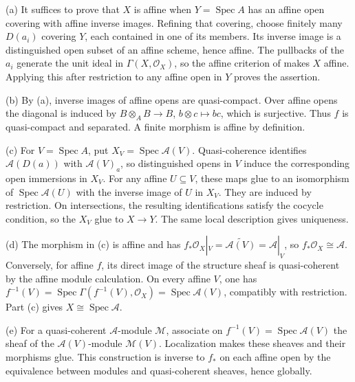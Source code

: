 (a) It suffices to prove that $X$ is affine when $Y=\operatorname{Spec}A$ has an affine open covering with affine inverse images. Refining that covering, choose finitely many $D(a_i)$ covering $Y$, each contained in one of its members. Its inverse image is a distinguished open subset of an affine scheme, hence affine. The pullbacks of the $a_i$ generate the unit ideal in $\Gamma(X,\mathcal O_X)$, so the affine criterion of  makes $X$ affine. Applying this after restriction to any affine open in $Y$ proves the assertion.

(b) By (a), inverse images of affine opens are quasi-compact. Over affine opens the diagonal is induced by $B\otimes_AB\to B$, $b\otimes c\mapsto bc$, which is surjective. Thus $f$ is quasi-compact and separated. A finite morphism is affine by definition.

(c) For $V=\operatorname{Spec}A$, put $X_V=\operatorname{Spec}\mathcal A(V)$. Quasi-coherence identifies $\mathcal A(D(a))$ with $\mathcal A(V)_a$, so distinguished opens in $V$ induce the corresponding open immersions in $X_V$. For any affine $U\subseteq V$, these maps glue to an isomorphism of $\operatorname{Spec}\mathcal A(U)$ with the inverse image of $U$ in $X_V$. They are induced by restriction. On intersections, the resulting identifications satisfy the cocycle condition, so the $X_V$ glue to $X\to Y$. The same local description gives uniqueness.

(d) The morphism in (c) is affine and has $f_*\mathcal O_X|_V=\widetilde{\mathcal A(V)}=\mathcal A|_V$, so $f_*\mathcal O_X\cong\mathcal A$. Conversely, for affine $f$, its direct image of the structure sheaf is quasi-coherent by the affine module calculation. On every affine $V$, one has $f^{-1}(V)=\operatorname{Spec}\Gamma(f^{-1}(V),\mathcal O_X)=\operatorname{Spec}\mathcal A(V)$, compatibly with restriction. Part (c) gives $X\cong\operatorname{Spec}\mathcal A$.

(e) For a quasi-coherent $\mathcal A$-module $\mathcal M$, associate on $f^{-1}(V)=\operatorname{Spec}\mathcal A(V)$ the sheaf of the $\mathcal A(V)$-module $\mathcal M(V)$. Localization makes these sheaves and their morphisms glue. This construction is inverse to $f_*$ on each affine open by the equivalence between modules and quasi-coherent sheaves, hence globally.
